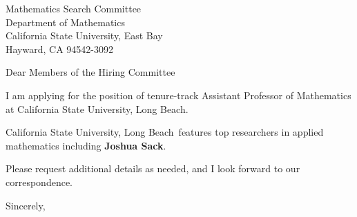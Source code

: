 




	
	
	\def\School{California State University, Long Beach}
	
	\begin{letter}
		{Mathematics Search Committee\\
			Department of Mathematics\\
			California State University, East Bay\\
			Hayward, CA 94542-3092
		}
		
		\opening{Dear Members of the Hiring Committee}
		
		
		I am applying for the position of tenure-track Assistant Professor of Mathematics at \School. 
		
		
		
		\School~features top researchers in applied mathematics including \textbf{Joshua Sack}. 
		
		
		
		
		
		Please request additional details as needed, and I look forward to our correspondence.
		
		\closing{Sincerely,}
	\end{letter}
